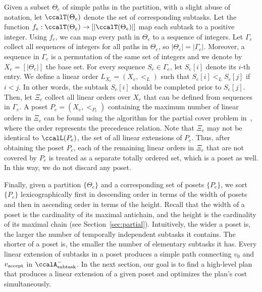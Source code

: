 \documentclass[Afour,sageh,times]{sagej}
\newcommand{\auto}[1]{\ccalA_{\textup{#1}}}
\newcommand{\vertex}[1]{v_{\textup{#1}}}
\begin{document}
Given a subset $\Theta_e$ of simple paths in the partition, with a slight abuse of notation, let $\ccalT(\Theta_e)$ denote the set of corresponding  subtasks. Let the function $f_e:\ccalT(\Theta_e)\to [|\ccalT(\Theta_e)|]$ map each subtask to a positive integer. Using $f_e$, we can map every path in $\Theta_e$ to a sequence of integers. Let $\Gamma_e$ collect all sequences of integers for all paths in $\Theta_e$, so $|\Theta_e| =  |\Gamma_e|$. Moreover, a sequence in $\Gamma_e$  is a permutation of the same set of integers and we denote by $X_e = [|\Theta_e|]$ the base set. For every sequence $S_e \in \Gamma_e$, let $S_e[i]$ denote its $i$-th entry. We define a linear order $L_{X_e} = (X_e, <_L)$ such that  $S_e[i]  <_L  S_e[j] $ if $i  <  j$. In other words, the subtask $S_e[i]$ should be completed prior to  $S_e[j]$. Then, let $\Xi_e$ collect all linear orders over $X_e$ that can be defined from sequences in $\Gamma_e$. A poset $P_e  = (X_e, <_{P_e})$  containing the maximum number of linear orders in $\Xi_e$ can be found using the algorithm for the partial cover problem in~\cite{heath2013poset}, where the order represents the precedence relation. Note that $\Xi_e$ may not be identical to $\ccalL(P_e)$, the set of all linear extensions of $P_e$. Thus, after obtaining the poset $P_e$, each of  the remaining linear orders in $\Xi_e$ that are not covered by $P_e$ is treated as a separate totally ordered set, which is a poset as well. In this way, we do not discard any poset.

{Finally, given a partition $\{\Theta_e\}$ and a corresponding set of posets $\{P_e\}$, we sort $\{P_e\}$ lexicographically first in descending order in terms of the width of posets and then in ascending order in terms of the height. Recall that the width of a poset is the cardinality of its maximal antichain, and the height is the cardinality of its maximal chain (see Section~\ref{sec:partial}). Intuitively, the wider a poset is, the larger the number of temporally independent subtasks it contains. The shorter of a poset is, the smaller the number of elementary subtasks it has.} Every linear extension of subtasks in a poset produces a simple path  connecting $v_0$ and $\vertex{accept}$ in $\auto{subtask}^-$. In the next section, our goal is to find a high-level plan that produces a linear extension of a given poset and optimizes the plan's cost simultaneously.
\end{document}
